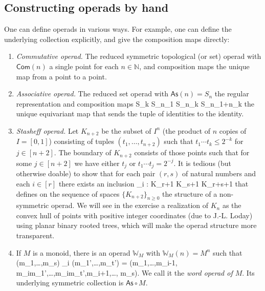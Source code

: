 \documentclass[fleqn,a4paper, twoside]{article}
\makeatletter
\newcommand{\0}{\langle 0\rangle}
\newenvironment{tenumerate}{
 \begin{enumerate}
  \setlength{\itemsep}{0pt}
  \setlength{\parskip}{0pt}
}{\end{enumerate}}
\let\[\@undefined
\DeclareRobustCommand{\[}{\begin{equation}}%
\let\]\@undefined
\DeclareRobustCommand{\]}{\end{equation}}%
\theoremstyle{mytheorem}
\theoremstyle{introthm}
\theoremstyle{mydefinition}
\theoremstyle{mydefinition2}
\theoremstyle{plain} %
\newcommand{\?}{\,?\,}
\newcommand{\NN}{\mathbb N}
\theoremstyle{mytheorem}
\theoremstyle{plain} %
\makeatother
\begin{document}
\subsection{Constructing operads by hand}

One can define operads in various ways. For example,
one can define the underlying collection explicitly,
and give the composition maps directly:
\begin{tenumerate}
\item \emph{Commutative operad.} The reduced symmetric topological (or set)
operad with $\mathsf{Com}(n)$ a single point for each
$n\in \NN$, and composition maps the unique
map from a point to a point.
\item \emph{Associative operad.} 
The reduced set operad with
$\mathsf{As}(n) = S_n$
the regular representation and composition maps
\[ S_k \times S_{n_1} \times
\cdots \times S_{n_k} \longrightarrow S_{n_1+\cdots n_k} \]
the unique equivariant map that sends the tuple
of identities to the identity.
\item  \emph{Stasheff operad.}
Let $K_{n+2}$ be the subset of $I^n$ (the
product of $n$ copies of $I=[0,1]$) 
consisting of tuples $(t_1,\ldots,t_{n+2})$
such that $t_1\cdots t_k\leqslant 2^{-k}$
for $j\in [n+2]$. The boundary of 
$K_{n+2}$ consists of those points such
that for some $j\in [n+2]$ we have
either $t_j$ or $t_1\cdots t_j = 2^{-j}$.
It is tedious (but otherwise doable)
to show that for each pair $(r,s)$ of
natural numbers and each $i\in [r]$
there exists an inclusion
\[ \circ_i : K_{r+1} \times K_{s+1} \longrightarrow
 	K_{r+s+1} \] 
that defines on the sequence of
spaces $\{K_{n+2}\}_{n\geqslant 0}$
the structure of a non-symmetric operad.
We will see in the exercise a realization
of $K_n$ as the convex hull of points
with positive integer coordinates
(due to J.-L. Loday)  using planar
binary rooted trees, which will make the
operad structure more transparent.

\item If $M$ is a monoid, there is an
operad $\mathbb W_M$ with $\mathbb{W}_M(n) =
M^n$ such that 
\[(m_1,\ldots,m_s) \circ_i (m_1',\ldots,m_t') = 
 	(m_1,\ldots,m_{i-1}, m_im_1',\ldots,m_im_t',m_{i+1},\ldots, m_s).\] We call it the
 \emph{word operad of $M$}. Its underlying
 symmetric collection is $\mathsf{As}\circ M$. 
 

\end{tenumerate}
\end{document}
